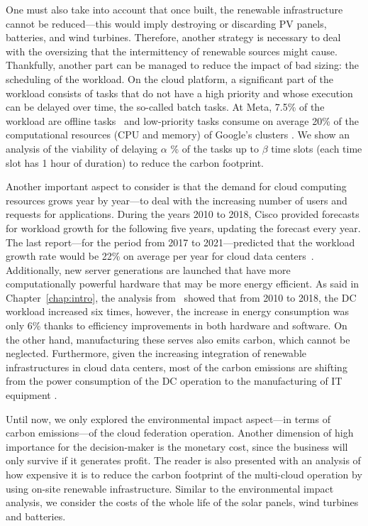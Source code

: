 One must also take into account that once built, the renewable infrastructure cannot be reduced---this would imply destroying or discarding PV panels, batteries, and wind turbines. Therefore, another strategy is necessary to deal with the oversizing that the intermittency of renewable sources might cause. Thankfully, another part can be managed to reduce the impact of bad  sizing: the scheduling of the workload. On the cloud platform, a significant part of the workload consists of tasks that do not have a high priority and whose execution can be delayed over time, the so-called batch tasks. At Meta, 7.5\% of the workload are offline tasks~\cite{acun2022holistic} and low-priority tasks consume on average 20\% of the computational resources (CPU and memory) of Google's clusters \cite{googleborg_2020}. We show an analysis of the viability of delaying $\alpha$ \% of the tasks up to $\beta$ time slots (each time slot has 1 hour of duration) to reduce the carbon footprint.

Another important aspect to consider is that the demand for cloud computing resources grows year by year---to deal with the increasing number of users and requests for applications. During the years 2010 to 2018, Cisco provided forecasts for workload growth for the following five years, updating the forecast every year. The last report---for the period from 2017 to 2021---predicted that the workload growth rate would be 22\% on average per year for cloud data centers~\cite{cisco_global_cloud_index_2018}. Additionally, new server generations are launched that have more computationally powerful hardware that may be more energy efficient. As said in Chapter~\ref{chap:intro},  the analysis from~\citet{masanet2020recalibrating} showed that from 2010 to 2018, the DC workload increased six times, however, the increase in energy consumption was only 6\% thanks to efficiency improvements in both hardware and software. On the other hand, manufacturing these serves also emits carbon, which cannot be neglected. Furthermore, given the increasing integration of renewable infrastructures in cloud data centers, most of the carbon emissions are shifting from the power consumption of the DC operation to the manufacturing of IT equipment \cite{gupta2021_chasingcarbon}.

Until now, we only explored the environmental impact aspect---in terms of carbon emissions---of the cloud federation operation. Another dimension of high importance for the decision-maker is the monetary cost, since the business will only survive if it generates profit. The reader is also presented with an analysis of how expensive it is to reduce the carbon footprint of the multi-cloud operation by using on-site renewable infrastructure. Similar to the environmental impact analysis, we consider the costs of the whole life of the solar panels, wind turbines and batteries.

